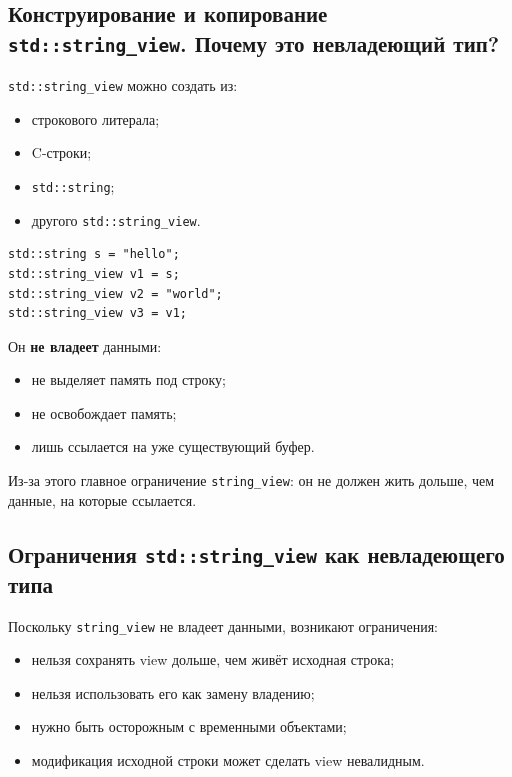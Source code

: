 \subsection{Конструирование и копирование \texttt{std::string\_view}. Почему это невладеющий тип?}
\texttt{std::string\_view} можно создать из:
\begin{itemize}
    \item строкового литерала;
    \item C-строки;
    \item \texttt{std::string};
    \item другого \texttt{std::string\_view}.
\end{itemize}

\begin{example}
\begin{verbatim}
std::string s = "hello";
std::string_view v1 = s;
std::string_view v2 = "world";
std::string_view v3 = v1;
\end{verbatim}
\end{example}

Он \textbf{не владеет} данными:
\begin{itemize}
    \item не выделяет память под строку;
    \item не освобождает память;
    \item лишь ссылается на уже существующий буфер.
\end{itemize}

\begin{remark}
Из-за этого главное ограничение \texttt{string\_view}: он не должен жить дольше, чем данные, на которые ссылается.
\end{remark}

\subsection{Ограничения \texttt{std::string\_view} как невладеющего типа}
Поскольку \texttt{string\_view} не владеет данными, возникают ограничения:
\begin{itemize}
    \item нельзя сохранять view дольше, чем живёт исходная строка;
    \item нельзя использовать его как замену владению;
    \item нужно быть осторожным с временными объектами;
    \item модификация исходной строки может сделать view невалидным.
\end{itemize}

